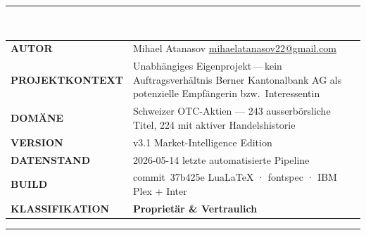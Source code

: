 \documentclass[11pt, a4paper, oneside, openany]{report}
\begin{document}
\begin{titlepage}
\vfill

\noindent\textcolor{DeepNavy}{\rule{30mm}{2pt}}\\[3mm]
\noindent\begin{tabular}{@{}p{32mm}@{\hskip 6pt}p{}@{}}
{\sffamily\fontsize{7.5}{10}\selectfont\bfseries\color{N700}\MakeUppercase{Autor}} & {\sffamily\small Mihael Atanasov \quad \textcolor{N600}{\datafont\footnotesize\href{mailto:mihaelatanasov22@gmail.com}{mihaelatanasov22@gmail.com}}} \\
{\sffamily\fontsize{7.5}{10}\selectfont\bfseries\color{N700}\MakeUppercase{Projektkontext}} & {\sffamily\small Unabhängiges Eigenprojekt\,---\,kein Auftragsverhältnis \quad \textcolor{N600}{\sffamily\footnotesize Berner Kantonalbank AG als potenzielle Empfängerin bzw.\ Interessentin}} \\
{\sffamily\fontsize{7.5}{10}\selectfont\bfseries\color{N700}\MakeUppercase{Domäne}} & {\sffamily\small Schweizer OTC-Aktien — 243 ausserbörsliche Titel, 224 mit aktiver Handelshistorie} \\
{\sffamily\fontsize{7.5}{10}\selectfont\bfseries\color{N700}\MakeUppercase{Version}} & {\datafont\small v3.1 \quad \textcolor{N600}{\sffamily\footnotesize Market-Intelligence Edition}} \\
{\sffamily\fontsize{7.5}{10}\selectfont\bfseries\color{N700}\MakeUppercase{Datenstand}} & {\datafont\small 2026-05-14 \quad \textcolor{N600}{\sffamily\footnotesize letzte automatisierte Pipeline}} \\
{\sffamily\fontsize{7.5}{10}\selectfont\bfseries\color{N700}\MakeUppercase{Build}} & {\datafont\small commit~37b425e \quad \textcolor{N600}{\sffamily\footnotesize LuaLaTeX · fontspec · IBM Plex + Inter}} \\
{\sffamily\fontsize{7.5}{10}\selectfont\bfseries\color{N700}\MakeUppercase{Klassifikation}} & {\sffamily\small\bfseries\color{SwissRed}Proprietär \& Vertraulich} \\
\end{tabular}

\vspace{8mm}

\noindent\textcolor{N300}{\rule{\textwidth}{0.3pt}}\\[1.5mm]

\restoregeometry
\end{titlepage}
\end{document}
